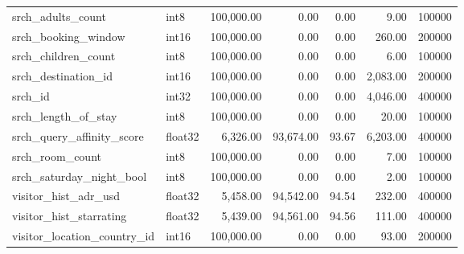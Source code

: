 \begin{table}
\begin{tabular}{llrrrrr}
srch\_adults\_count & int8 & 100,000.00 & 0.00 & 0.00 & 9.00 & 100000 \\
srch\_booking\_window & int16 & 100,000.00 & 0.00 & 0.00 & 260.00 & 200000 \\
srch\_children\_count & int8 & 100,000.00 & 0.00 & 0.00 & 6.00 & 100000 \\
srch\_destination\_id & int16 & 100,000.00 & 0.00 & 0.00 & 2,083.00 & 200000 \\
srch\_id & int32 & 100,000.00 & 0.00 & 0.00 & 4,046.00 & 400000 \\
srch\_length\_of\_stay & int8 & 100,000.00 & 0.00 & 0.00 & 20.00 & 100000 \\
srch\_query\_affinity\_score & float32 & 6,326.00 & 93,674.00 & 93.67 & 6,203.00 & 400000 \\
srch\_room\_count & int8 & 100,000.00 & 0.00 & 0.00 & 7.00 & 100000 \\
srch\_saturday\_night\_bool & int8 & 100,000.00 & 0.00 & 0.00 & 2.00 & 100000 \\
visitor\_hist\_adr\_usd & float32 & 5,458.00 & 94,542.00 & 94.54 & 232.00 & 400000 \\
visitor\_hist\_starrating & float32 & 5,439.00 & 94,561.00 & 94.56 & 111.00 & 400000 \\
visitor\_location\_country\_id & int16 & 100,000.00 & 0.00 & 0.00 & 93.00 & 200000 \\
\bottomrule
\end{tabular}
\end{table}
